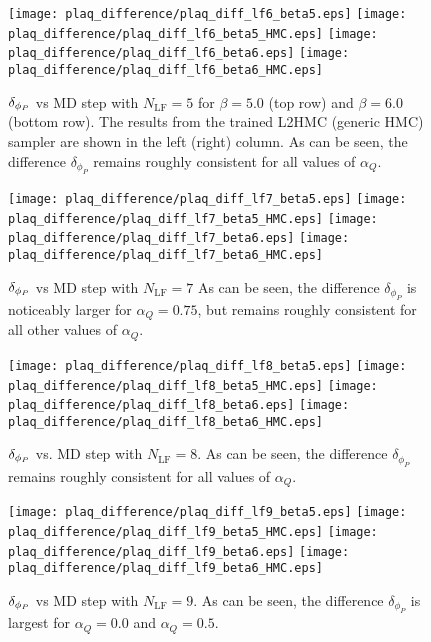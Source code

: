 \documentclass[../main.tex]{subfiles}
\begin{document}
%
\begin{figure}[htpb]\label{fig:plaq_diff_plots_lf6}
  \texttt{[image: plaq\_difference/plaq\_diff\_lf6\_beta5.eps]}
  \hfill
  \texttt{[image: plaq\_difference/plaq\_diff\_lf6\_beta5\_HMC.eps]}
  \texttt{[image: plaq\_difference/plaq\_diff\_lf6\_beta6.eps]}
  \hfill
  \texttt{[image: plaq\_difference/plaq\_diff\_lf6\_beta6\_HMC.eps]}
  \caption{${\delta_{\phi_{P}}}$ vs MD step with $N_{\mathrm{LF}} = 5$ for $\beta = 5.0$ (top row) and $\beta = 6.0$ (bottom
    row). The results from the trained L2HMC (generic HMC) sampler are shown in the left (right) column. As can be seen,
    the difference $\delta_{\phi_{P}}$ remains roughly consistent for all values of $\alpha_Q$.}
\end{figure}
%
\begin{figure}[htpb]\label{fig:plaq_diff_plots_lf7}
  \texttt{[image: plaq\_difference/plaq\_diff\_lf7\_beta5.eps]}
  \hfill
  \texttt{[image: plaq\_difference/plaq\_diff\_lf7\_beta5\_HMC.eps]}
  \texttt{[image: plaq\_difference/plaq\_diff\_lf7\_beta6.eps]}
  \hfill
  \texttt{[image: plaq\_difference/plaq\_diff\_lf7\_beta6\_HMC.eps]}
  \caption{${\delta_{\phi_{P}}}$ vs MD step with $N_{\mathrm{LF}} = 7$ As can be seen, the difference $\delta_{\phi_{P}}$ is
    noticeably larger for $\alpha_Q = 0.75$, but remains roughly consistent for all other values of $\alpha_Q$.}
\end{figure}
%
\begin{figure}[htpb]\label{fig:plaq_diff_plots_lf8_beta5}
  \texttt{[image: plaq\_difference/plaq\_diff\_lf8\_beta5.eps]}
  \hfill
  \texttt{[image: plaq\_difference/plaq\_diff\_lf8\_beta5\_HMC.eps]}
  \texttt{[image: plaq\_difference/plaq\_diff\_lf8\_beta6.eps]}
  \hfill
  \texttt{[image: plaq\_difference/plaq\_diff\_lf8\_beta6\_HMC.eps]}
  \caption{${\delta_{\phi_{P}}}$ vs. MD step with $N_{\mathrm{LF}} = 8$. As can be seen, the difference $\delta_{\phi_{P}}$
    remains roughly consistent for all values of $\alpha_Q$.}
\end{figure}
%
\begin{figure}[htpb]\label{fig:plaq_diff_plots_lf9}
  \texttt{[image: plaq\_difference/plaq\_diff\_lf9\_beta5.eps]}
  \hfill
  \texttt{[image: plaq\_difference/plaq\_diff\_lf9\_beta5\_HMC.eps]}
  \texttt{[image: plaq\_difference/plaq\_diff\_lf9\_beta6.eps]}
  \hfill
  \texttt{[image: plaq\_difference/plaq\_diff\_lf9\_beta6\_HMC.eps]}
  \caption{${\delta_{\phi_{P}}}$ vs MD step with $N_{\mathrm{LF}} = 9$. As can be seen, the difference $\delta_{\phi_{P}}$ is
  largest for $\alpha_Q = 0.0$ and $\alpha_Q = 0.5$.}
\end{figure}
\end{document}
